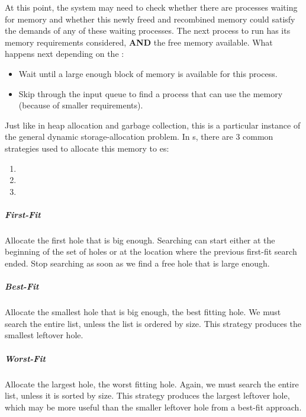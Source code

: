 At this point, the system may need to check whether there are processes waiting for memory and whether this newly freed and recombined memory could satisfy the demands of any of these waiting processes.
The next process to run has its memory requirements considered, \textbf{AND} the free memory available.
What happens next depending on the :
\begin{itemize}[noitemsep]
\item Wait until a large enough block of memory is available for this process.
\item Skip through the input queue to find a process that can use the memory (because of smaller requirements).
\end{itemize}

Just like in heap allocation and garbage collection, this is a particular instance of the general dynamic storage-allocation problem.
In s, there are 3 common strategies used to allocate this memory to es:
\begin{enumerate}[noitemsep]
\item {}
\item {}
\item {}
\end{enumerate}

\subparagraph{First-Fit}\label{subpar:First_Fit}
Allocate the first hole that is big enough.
Searching can start either at the beginning of the set of holes or at the location where the previous first-fit search ended.
Stop searching as soon as we find a free hole that is large enough.

\subparagraph{Best-Fit}\label{subpar:Best_Fit}
Allocate the smallest hole that is big enough, the best fitting hole.
We must search the entire list, unless the list is ordered by size.
This strategy produces the smallest leftover hole.

\subparagraph{Worst-Fit}\label{subpar:Worst_Fit}
Allocate the largest hole, the worst fitting hole.
Again, we must search the entire list, unless it is sorted by size.
This strategy produces the largest leftover hole, which may be more useful than the smaller leftover hole from a best-fit approach.


